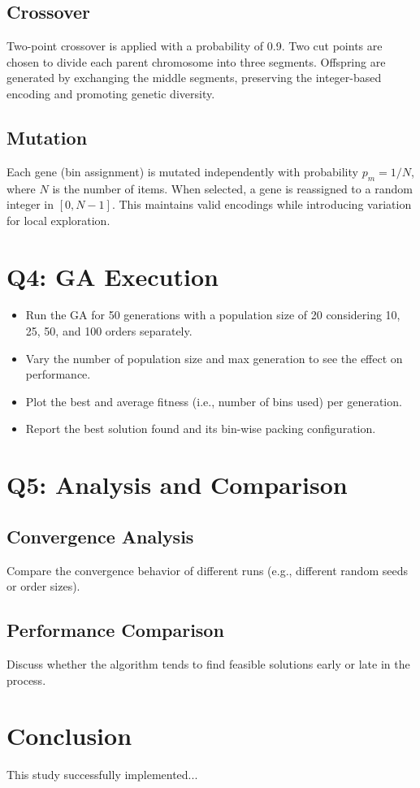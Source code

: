\documentclass[journal,12pt,onecolumn]{IEEEtran}
\begin{document}
\subsection{Crossover}

Two-point crossover is applied with a probability of 0.9. Two cut points are chosen to divide each parent chromosome into three segments. Offspring are generated by exchanging the middle segments, preserving the integer-based encoding and promoting genetic diversity.

\subsection{Mutation}

Each gene (bin assignment) is mutated independently with probability $p_m = 1/N$, where $N$ is the number of items. When selected, a gene is reassigned to a random integer in $[0, N-1]$. This maintains valid encodings while introducing variation for local exploration.


\section{Q4: GA Execution}

\begin{itemize}
    \item Run the GA for 50 generations with a population size of 20 considering 10, 25, 50, and 100 orders separately.
    \item Vary the number of population size and max generation to see the effect on performance.
    \item Plot the best and average fitness (i.e., number of bins used) per generation.
    \item Report the best solution found and its bin-wise packing configuration.
\end{itemize}

\section{Q5: Analysis and Comparison}

\subsection{Convergence Analysis}

Compare the convergence behavior of different runs (e.g., different random seeds or order sizes).

\subsection{Performance Comparison}

Discuss whether the algorithm tends to find feasible solutions early or late in the process.

\section{Conclusion}
This study successfully implemented...
\end{document}
